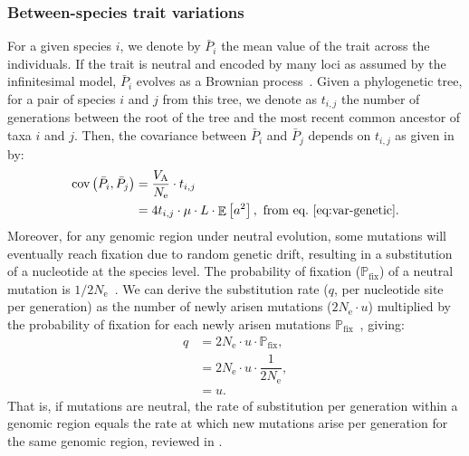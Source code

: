 \documentclass{article}
\newcommand{\Multiply}{\cdot}
\DeclareMathOperator{\E}{\mathbb{E}}
\DeclareMathOperator{\Cov}{\text{cov}}
\newcommand{\Ne}{N_{\text{e}}}
\newcommand{\proba}{\mathbb{P}}
\newcommand{\pfix}{\proba_{\text{fix}}}
\newcommand{\Spi}{i}
\newcommand{\Spj}{j}
\newcommand{\NbrGen}{t_{\Spi, \Spj}}
\newcommand{\Trait}{P}
\newcommand{\MeanTrait}{\bar{\Trait}}
\newcommand{\VarPhy}{\Cov \left( \MeanTrait_{\Spi}, \MeanTrait_{\Spj}\right)}
\newcommand{\MutationRatePheno}{\mu}
\newcommand{\MutationRateNuc}{u}
\newcommand{\SubRate}{q}
\newcommand{\NbrLoci}{L}
\newcommand{\VarGenetic}{V_{\mathrm{A}}}
\newcommand{\GenArchi}{\NbrLoci \Multiply \E \left[ a^2 \right]}
\begin{document}
\subsubsection*{Between-species trait variations}\label{subsec:between-species-var}
For a given species $\Spi$, we denote by $\MeanTrait_{\Spi}$ the mean value of the trait across the individuals.
If the trait is neutral and encoded by many loci as assumed by the infinitesimal model, $\MeanTrait_{\Spi}$ evolves as a Brownian process~\citep{felsenstein_phylogenies_1985, hansen_translating_1996}.
Given a phylogenetic tree, for a pair of species $\Spi$ and $\Spj$ from this tree, we denote as $\NbrGen$ the number of generations between the root of the tree and the most recent common ancestor of taxa $\Spi$ and $\Spj$.
Then, the covariance between $\MeanTrait_{\Spi}$ and $\MeanTrait_{\Spj}$ depends on $\NbrGen$ as given in \citet{hansen_translating_1996} by:
\begin{align}
    \VarPhy & = \frac{\VarGenetic}{\Ne} \Multiply \NbrGen \\
    & = 4 \NbrGen \Multiply \MutationRatePheno \Multiply \GenArchi \label{eq:covar},\text{ from eq.~\ref{eq:var-genetic}}.
\end{align}
Moreover, for any genomic region under neutral evolution, some mutations will eventually reach fixation due to random genetic drift, resulting in a substitution of a nucleotide at the species level.
The probability of fixation ($\pfix$) of a neutral mutation is $1/2\Ne$~\citep{kimura_probability_1962}.
We can derive the substitution rate ($\SubRate$, per nucleotide site per generation) as the number of newly arisen mutations ($2\Ne \Multiply \MutationRateNuc$) multiplied by the probability of fixation for each newly arisen mutations $\pfix$~\citep{kimura_evolutionary_1968}, giving:
\begin{align}
    \SubRate & = 2 \Ne \Multiply \MutationRateNuc \Multiply \pfix, \\
    & = 2 \Ne  \Multiply \MutationRateNuc  \Multiply \dfrac{1}{2\Ne}, \\
    & = \MutationRateNuc. \label{eq:substitution-rate}
\end{align}
That is, if mutations are neutral, the rate of substitution per generation within a genomic region equals the rate at which new mutations arise per generation for the same genomic region, reviewed in \citet{mccandlish_modeling_2014}.
\end{document}
